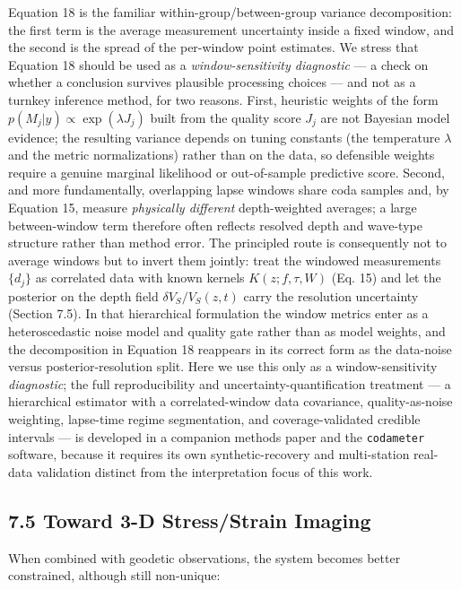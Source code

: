 \documentclass[draft]{agujournal2019}
\begin{document}
Equation 18 is the familiar within-group/between-group variance
decomposition: the first term is the average measurement uncertainty
inside a fixed window, and the second is the spread of the per-window
point estimates. We stress that Equation 18 should be used as a
\emph{window-sensitivity diagnostic} --- a check on whether a conclusion
survives plausible processing choices --- and not as a turnkey inference
method, for two reasons. First, heuristic weights of the form
\(p(M_j|y)\propto\exp(\lambda J_j)\) built from the quality score
\(J_j\) are not Bayesian model evidence; the resulting variance depends
on tuning constants (the temperature \(\lambda\) and the metric
normalizations) rather than on the data, so defensible weights require a
genuine marginal likelihood or out-of-sample predictive score. Second,
and more fundamentally, overlapping lapse windows share coda samples
and, by Equation 15, measure \emph{physically different} depth-weighted
averages; a large between-window term therefore often reflects resolved
depth and wave-type structure rather than method error. The principled
route is consequently not to average windows but to invert them jointly:
treat the windowed measurements \(\{d_j\}\) as correlated data with
known kernels \(K(z;f,\tau,W)\) (Eq. 15) and let the posterior on the
depth field \(\delta V_S/V_S(z,t)\) carry the resolution uncertainty
(Section 7.5). In that hierarchical formulation the window metrics enter
as a heteroscedastic noise model and quality gate rather than as model
weights, and the decomposition in Equation 18 reappears in its correct
form as the data-noise versus posterior-resolution split. Here we use
this only as a window-sensitivity \emph{diagnostic}; the full
reproducibility and uncertainty-quantification treatment --- a
hierarchical estimator with a correlated-window data covariance,
quality-as-noise weighting, lapse-time regime segmentation, and
coverage-validated credible intervals --- is developed in a companion
methods paper and the \texttt{codameter} software, because it requires
its own synthetic-recovery and multi-station real-data validation
distinct from the interpretation focus of this work.

\subsection{7.5 Toward 3-D Stress/Strain
Imaging}\label{toward-3-d-stressstrain-imaging}

When combined with geodetic observations, the system becomes better
constrained, although still non-unique:
\end{document}
